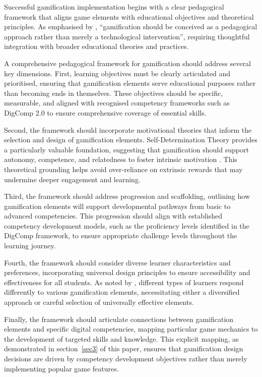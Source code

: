 \documentclass[cte]{acnsart}
\begin{document}
Successful gamification implementation begins with a clear pedagogical framework that aligns game elements with educational objectives and theoretical principles. As emphasised by \citet{Moutinho202122}, ``gamification should be conceived as a pedagogical approach rather than merely a technological intervention'', requiring thoughtful integration with broader educational theories and practices.

A comprehensive pedagogical framework for gamification should address several key dimensions. First, learning objectives must be clearly articulated and prioritised, ensuring that gamification elements serve educational purposes rather than becoming ends in themselves. These objectives should be specific, measurable, and aligned with recognised competency frameworks such as DigComp 2.0 to ensure comprehensive coverage of essential skills.

Second, the framework should incorporate motivational theories that inform the selection and design of gamification elements. Self-Determination Theory provides a particularly valuable foundation, suggesting that gamification should support autonomy, competence, and relatedness to foster intrinsic motivation \cite{Gupta2022341}. This theoretical grounding helps avoid over-reliance on extrinsic rewards that may undermine deeper engagement and learning.

Third, the framework should address progression and scaffolding, outlining how gamification elements will support developmental pathways from basic to advanced competencies. This progression should align with established competency development models, such as the proficiency levels identified in the DigComp framework, to ensure appropriate challenge levels throughout the learning journey.

Fourth, the framework should consider diverse learner characteristics and preferences, incorporating universal design principles to ensure accessibility and effectiveness for all students. As noted by \citet{Ho2024139}, different types of learners respond differently to various gamification elements, necessitating either a diversified approach or careful selection of universally effective elements.

Finally, the framework should articulate connections between gamification elements and specific digital competencies, mapping particular game mechanics to the development of targeted skills and knowledge. This explicit mapping, as demonstrated in section~\ref{sec3} of this paper, ensures that gamification design decisions are driven by competency development objectives rather than merely implementing popular game features.
\end{document}
